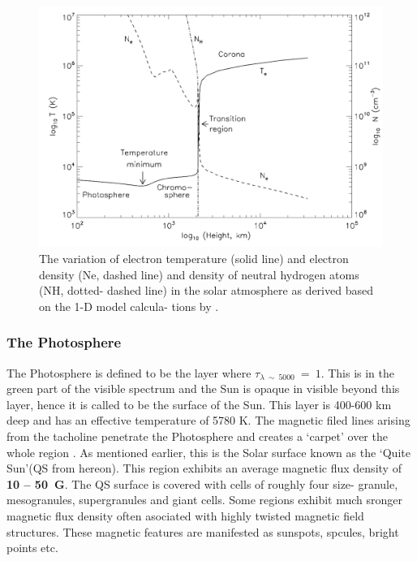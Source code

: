 \begin{figure}[h!]
    \centering
    \includegraphics[width = 0.8\linewidth]{Figures/solar_atm.png}
    \caption{The variation of electron temperature (solid line) and electron density (Ne, dashed line) and density of neutral hydrogen atoms (NH, dotted- dashed line) in the solar atmosphere as derived based on the 1-D model calcula- tions by .}
    \label{fig_solar_atm}
\end{figure}

\subsubsection{The Photosphere}\label{photosphere}

The Photosphere is defined to be the layer where $\tau_{\lambda~\sim~5000}~=~1$. This is in the green part of the visible spectrum and the Sun is opaque in visible beyond this layer, hence it is called to be the surface of the Sun. This layer is 400-600 km deep and has an effective temperature of 5780 K. The magnetic filed lines arising from the tacholine penetrate the Photosphere and creates a `carpet' over the whole region . As mentioned earlier, this is the Solar surface known as the `Quite Sun'(QS from hereon). This region exhibits an average magnetic flux density of \textbf{10 -- 50~G}. The QS surface is covered with cells of roughly four size- granule, mesogranules, supergranules and giant cells. Some regions exhibit much sronger magnetic flux density often asociated with highly twisted magnetic field structures. These magnetic features are manifested as sunspots, spcules, bright points etc. 

